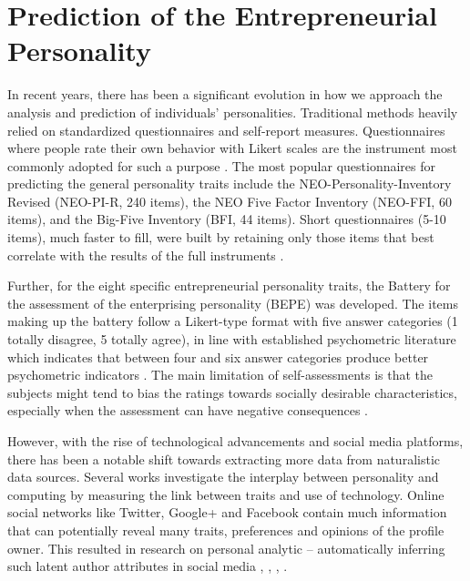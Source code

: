 \section{Prediction of the Entrepreneurial Personality}
In recent years, there has been a significant evolution in how we approach the analysis and prediction of individuals' personalities. Traditional methods heavily relied on standardized questionnaires and self-report measures. Questionnaires where people rate their own behavior with Likert scales are the instrument most commonly adopted for such a purpose \cite{vinciarelli2014survey}. The most popular questionnaires for predicting the general personality traits include the NEO-Personality-Inventory Revised (NEO-PI-R, 240 items), the NEO Five Factor Inventory (NEO-FFI, 60 items), and the Big-Five Inventory (BFI, 44 items). Short questionnaires (5-10 items), much faster to fill, were built by retaining only those items that best correlate with the results of the full instruments \cite{vinciarelli2014survey}.

Further, for the eight specific entrepreneurial personality traits, the Battery for the assessment of the enterprising personality (BEPE) was developed. The items making up the battery follow a Likert-type format with five answer categories (1 totally disagree, 5 totally agree), in line with established psychometric literature which indicates that between four and six answer categories produce better psychometric indicators \cite{cuesta2018assessment}. The main limitation of self-assessments is that the subjects might tend to bias the ratings towards socially desirable characteristics, especially when the assessment can have negative consequences \cite{vinciarelli2014survey}. 

However, with the rise of technological advancements and social media platforms, there has been a notable shift towards extracting more data from naturalistic data sources. Several works investigate the interplay between personality and computing by measuring the link between traits and use of technology. Online social networks like Twitter, Google+ and Facebook contain much information that can potentially reveal many traits, preferences and opinions of the profile owner. This resulted in research on personal analytic – automatically inferring such latent author attributes in social media \cite{el2022deep}, \cite{tandera2017personality}, \cite{volkova2015inferring}, \cite{vinciarelli2014survey}.

